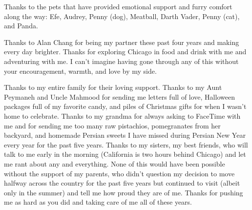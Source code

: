 Thanks to the pets that have provided emotional support and furry comfort along the way: Efe, Audrey, Penny (dog), Meatball, Darth Vader, Penny (cat), and Panda.

Thanks to Alan Chang for being my partner these past four years and making every day brighter. Thanks for exploring Chicago in food and drink with me and adventuring with me. I can't imagine having gone through any of this without your encouragement, warmth, and love by my side.

Thanks to my entire family for their loving support. Thanks to my Aunt Peymaneh and Uncle Mahmood for sending me letters full of love, Halloween packages full of my favorite candy, and piles of Christmas gifts for when I wasn't home to celebrate. Thanks to my grandma for always asking to FaceTime with me and for sending me too many raw pistachios, pomegranates from her backyard, and homemade Persian sweets I have missed during Persian New Year every year for the past five years. Thanks to my sisters, my best friends, who will talk to me early in the morning (California is two hours behind Chicago) and let me rant about any and everything. None of this would have been possible without the support of my parents, who didn't question my decision to move halfway across the country for the past five years but continued to visit (albeit only in the summer) and tell me how proud they are of me. Thanks for pushing me as hard as you did and taking care of me all of these years. 
